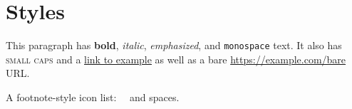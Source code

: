 \documentclass{article}
\begin{document}
\section{Styles}

This paragraph has \textbf{bold}, \textit{italic}, \emph{emphasized}, and \texttt{monospace} text.
It also has \textsc{small caps} and a \href{https://example.com}{link to example} as well as a bare \url{https://example.com/bare} URL.

A footnote-style icon list: \faGithub\ \faLinkedin\ \faTwitter and \quad spaces.
\end{document}
